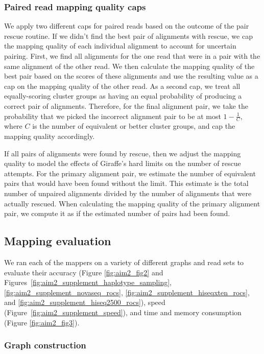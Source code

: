 \documentclass[11pt]{ucscthesis}
\begin{document}
\subsubsection{Paired read mapping quality caps}

We apply two different caps for paired reads based on the outcome of the pair rescue routine.
If we didn't find the best pair of alignments with rescue, we cap the mapping quality of each individual alignment to account for uncertain pairing.
First, we find all alignments for the one read that were in a pair with the same alignment of the other read.
We then calculate the mapping quality of the best pair based on the scores of these alignments and use the resulting value as a cap on the mapping quality of the other read.
As a second cap, we treat all equally-scoring cluster groups as having an equal probability of producing a correct pair of alignments.
Therefore, for the final alignment pair, we take the probability that we picked the incorrect alignment pair to be at most $1 - \frac{1}{C}$, where $C$ is the number of equivalent or better cluster groups, and cap the mapping quality accordingly.


If all pairs of alignments were found by rescue, then we adjust the mapping quality to model the effects of Giraffe's hard limits on the number of rescue attempts.
For the primary alignment pair, we estimate the number of equivalent pairs that would have been found without the limit.
This estimate is the total number of unpaired alignments divided by the number of alignments that were actually rescued.
When calculating the mapping quality of the primary alignment pair, we compute it as if the estimated number of pairs had been found.

\subsection{Mapping evaluation}

We ran each of the mappers on a variety of different graphs and read sets to evaluate their accuracy (Figure \ref{fig:aim2_fig2} and Figures~\ref{fig:aim2_supplement_haplotype_sampling}, \ref{fig:aim2_supplement_novaseq_rocs}, \ref{fig:aim2_supplement_hiseqxten_rocs}, and \ref{fig:aim2_supplement_hiseq2500_rocs}), speed (Figure~\ref{fig:aim2_supplement_speed}), and time and memory consumption (Figure \ref{fig:aim2_fig3}).


\subsubsection{Graph construction}
\label{subsec:graphconstruction}
\end{document}
